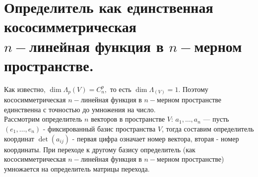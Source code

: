 \documentclass[draft]{article}%
\newcommand{\baz}[1]{\left(#1_1,\dots,#1_n\right)}%
\begin{document}
\section{Определитель как единственная кососимметрическая\\ $n-$линейная функция в $n-$мерном пространстве.}
\label{q64}
Как известно, $\dim\Lambda_p(V)=C_n^p,$ то есть $\dim\Lambda_(V)=1.$ Поэтому кососимметрическая $n-$линейная функция в $n-$мерном пространстве
единственна с точностью до умножения на число.
\\
Рассмотрим определитель $n$ векторов в пространстве $V$: $a_1,\dots,a_n$ ---
пусть $\baz{e}$ - фиксированный базис пространства $V$, тогда составим определитель координат $\det(a_{ij})$ - первая цифра
означает номер вектора, вторая - номер координаты. При переходе к другому базису определитель (как кососимметрическая $n-$линейная функция в $n-$мерном пространстве) умножается
на определитель матрицы перехода.
\end{document}
